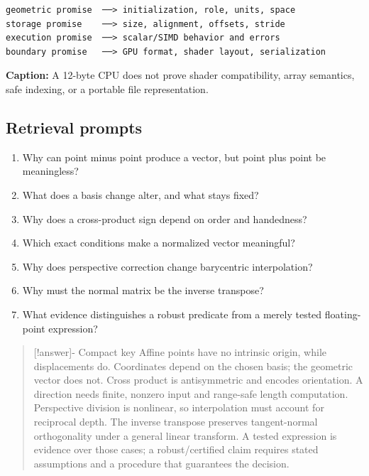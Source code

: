 \hypertarget{appendix-38d9c8aca357-a-three-number-type-is-not-the-complete-contract}{}

\begin{verbatim}
geometric promise  ──> initialization, role, units, space
storage promise    ──> size, alignment, offsets, stride
execution promise  ──> scalar/SIMD behavior and errors
boundary promise   ──> GPU format, shader layout, serialization
\end{verbatim}

\textbf{Caption:} A 12-byte CPU  does not prove shader compatibility, array semantics, safe indexing, or a portable file representation.

\subsection{Retrieval prompts}\label{appendix-38d9c8aca357-retrieval-prompts}

\hypertarget{appendix-38d9c8aca357-retrieval-prompts}{}

\begin{enumerate}
\def\labelenumi{\arabic{enumi}.}
\tightlist
\item
  Why can point minus point produce a vector, but point plus point be meaningless?
\item
  What does a basis change alter, and what stays fixed?
\item
  Why does a cross-product sign depend on order and handedness?
\item
  Which exact conditions make a normalized vector meaningful?
\item
  Why does perspective correction change barycentric interpolation?
\item
  Why must the normal matrix be the inverse transpose?
\item
  What evidence distinguishes a robust predicate from a merely tested floating-point expression?
\end{enumerate}

\begin{quote}
{[}!answer{]}- Compact key Affine points have no intrinsic origin, while displacements do. Coordinates depend on the chosen basis; the geometric vector does not. Cross product is antisymmetric and encodes orientation. A direction needs finite, nonzero input and range-safe length computation. Perspective division is nonlinear, so interpolation must account for reciprocal depth. The inverse transpose preserves tangent-normal orthogonality under a general linear transform. A tested expression is evidence over those cases; a robust/certified claim requires stated assumptions and a procedure that guarantees the decision.
\end{quote}

